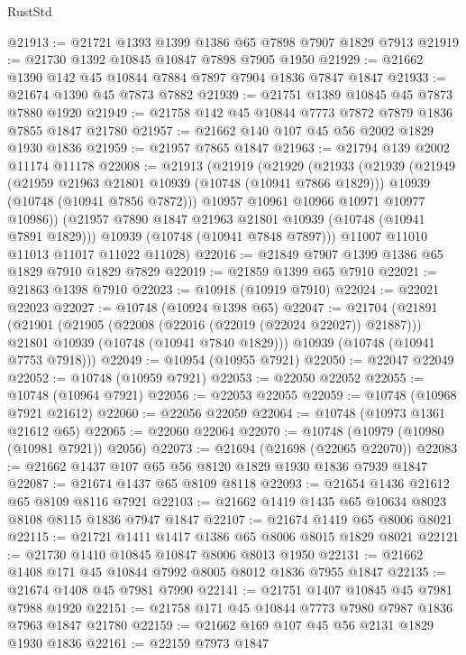 \begin{lexlean}{RustStd}
\begin{coremodule}
@21913 := @21721 @1393 @1399 @1386 @65 @7898 @7907 @1829 @7913
@21919 := @21730 @1392 @10845 @10847 @7898 @7905 @1950
@21929 := @21662 @1390 @142 @45 @10844 @7884 @7897 @7904 @1836 @7847 @1847
@21933 := @21674 @1390 @45 @7873 @7882
@21939 := @21751 @1389 @10845 @45 @7873 @7880 @1920
@21949 := @21758 @142 @45 @10844 @7773 @7872 @7879 @1836 @7855 @1847 @21780
@21957 := @21662 @140 @107 @45 @56 @2002 @1829 @1930 @1836
@21959 := @21957 @7865 @1847
@21963 := @21794 @139 @2002 @11174 @11178
@22008 := @21913
    (@21919
      (@21929
        (@21933
          (@21939
            (@21949
              (@21959 @21963 @21801 @10939 (@10748 (@10941 @7866 @1829)))
              @10939
              (@10748 (@10941 @7856 @7872)))
            @10957
            @10961
            @10966
            @10971
            @10977
            @10986))
        (@21957 @7890 @1847 @21963 @21801 @10939 (@10748 (@10941 @7891 @1829)))
        @10939
        (@10748 (@10941 @7848 @7897)))
      @11007
      @11010
      @11013
      @11017
      @11022
      @11028)
@22016 := @21849 @7907 @1399 @1386 @65 @1829 @7910 @1829 @7829
@22019 := @21859 @1399 @65 @7910
@22021 := @21863 @1398 @7910
@22023 := @10918 (@10919 @7910)
@22024 := @22021 @22023
@22027 := @10748 (@10924 @1398 @65)
@22047 := @21704
    (@21891
      (@21901
        (@21905 (@22008 (@22016 (@22019 (@22024 @22027)) @21887)))
        @21801
        @10939
        (@10748 (@10941 @7840 @1829)))
      @10939
      (@10748 (@10941 @7753 @7918)))
@22049 := @10954 (@10955 @7921)
@22050 := @22047 @22049
@22052 := @10748 (@10959 @7921)
@22053 := @22050 @22052
@22055 := @10748 (@10964 @7921)
@22056 := @22053 @22055
@22059 := @10748 (@10968 @7921 @21612)
@22060 := @22056 @22059
@22064 := @10748 (@10973 @1361 @21612 @65)
@22065 := @22060 @22064
@22070 := @10748 (@10979 (@10980 (@10981 @7921)) @2056)
@22073 := @21694 (@21698 (@22065 @22070))
@22083 := @21662 @1437 @107 @65 @56 @8120 @1829 @1930 @1836 @7939 @1847
@22087 := @21674 @1437 @65 @8109 @8118
@22093 := @21654 @1436 @21612 @65 @8109 @8116 @7921
@22103 := @21662 @1419 @1435 @65 @10634 @8023 @8108 @8115 @1836 @7947 @1847
@22107 := @21674 @1419 @65 @8006 @8021
@22115 := @21721 @1411 @1417 @1386 @65 @8006 @8015 @1829 @8021
@22121 := @21730 @1410 @10845 @10847 @8006 @8013 @1950
@22131 := @21662 @1408 @171 @45 @10844 @7992 @8005 @8012 @1836 @7955 @1847
@22135 := @21674 @1408 @45 @7981 @7990
@22141 := @21751 @1407 @10845 @45 @7981 @7988 @1920
@22151 := @21758 @171 @45 @10844 @7773 @7980 @7987 @1836 @7963 @1847 @21780
@22159 := @21662 @169 @107 @45 @56 @2131 @1829 @1930 @1836
@22161 := @22159 @7973 @1847

\end{coremodule}
\end{lexlean}
